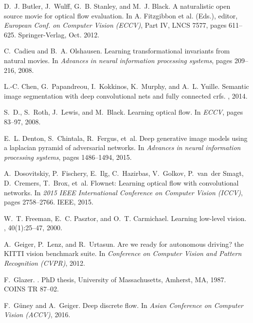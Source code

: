 \documentclass[10pt,twocolumn,letterpaper]{article}
\begin{document}
\begin{thebibliography}{10}
D.~J. Butler, J.~Wulff, G.~B. Stanley, and M.~J. Black.
\newblock A naturalistic open source movie for optical flow evaluation.
\newblock In {A. Fitzgibbon et al. (Eds.)}, editor, {\em European Conf. on
  Computer Vision (ECCV)}, Part IV, LNCS 7577, pages 611--625. Springer-Verlag,
  Oct. 2012.

C.~Cadieu and B.~A. Olshausen.
\newblock Learning transformational invariants from natural movies.
\newblock In {\em Advances in neural information processing systems}, pages
  209--216, 2008.

L.-C. Chen, G.~Papandreou, I.~Kokkinos, K.~Murphy, and A.~L. Yuille.
\newblock Semantic image segmentation with deep convolutional nets and fully
  connected crfs.
, 2014.

S.~D., S.~Roth, J.~Lewis, and M.~Black.
\newblock Learning optical flow.
\newblock In {\em ECCV}, pages 83--97, 2008.

E.~L. Denton, S.~Chintala, R.~Fergus, et~al.
\newblock Deep generative image models using a laplacian pyramid of adversarial
  networks.
\newblock In {\em Advances in neural information processing systems}, pages
  1486--1494, 2015.

A.~Dosovitskiy, P.~Fischery, E.~Ilg, C.~Hazirbas, V.~Golkov, P.~van~der Smagt,
  D.~Cremers, T.~Brox, et~al.
\newblock Flownet: Learning optical flow with convolutional networks.
\newblock In {\em 2015 IEEE International Conference on Computer Vision
  (ICCV)}, pages 2758--2766. IEEE, 2015.

W.~T. Freeman, E.~C. Pasztor, and O.~T. Carmichael.
\newblock Learning low-level vision.
, 40(1):25--47, 2000.

A.~Geiger, P.~Lenz, and R.~Urtasun.
\newblock Are we ready for autonomous driving? the {KITTI} vision benchmark
  suite.
\newblock In {\em Conference on Computer Vision and Pattern Recognition
  (CVPR)}, 2012.

F.~Glazer.
.
\newblock PhD thesis, University of Massachusetts, Amherst, MA, 1987.
\newblock COINS TR 87--02.

F.~G{\"u}ney and A.~Geiger.
\newblock Deep discrete flow.
\newblock In {\em Asian Conference on Computer Vision (ACCV)}, 2016.


\end{thebibliography}
\end{document}
